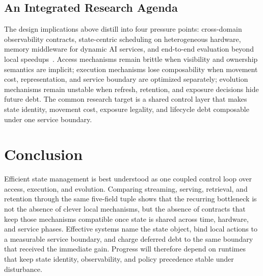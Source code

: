 ﻿\documentclass[manuscript]{acmart}
\begin{document}
\subsection{An Integrated Research Agenda}

The design implications above distill into four pressure points: cross-domain observability contracts, state-centric scheduling on heterogeneous hardware, memory middleware for dynamic AI services, and end-to-end evaluation beyond local speedups~\cite{zhang2019briskstream,zhang2020finestream,kwon2023pagedattention,sheng2023flexgen,cong2026mico,zhang2026neuromem,liu2026sage}. Access mechanisms remain brittle when visibility and ownership semantics are implicit; execution mechanisms lose composability when movement cost, representation, and service boundary are optimized separately; evolution mechanisms remain unstable when refresh, retention, and exposure decisions hide future debt. The common research target is a shared control layer that makes state identity, movement cost, exposure legality, and lifecycle debt composable under one service boundary.

\section{Conclusion}
\label{sec:conclusion}

Efficient state management is best understood as one coupled control loop over access, execution, and evolution. Comparing streaming, serving, retrieval, and retention through the same five-field tuple shows that the recurring bottleneck is not the absence of clever local mechanisms, but the absence of contracts that keep those mechanisms compatible once state is shared across time, hardware, and service phases. Effective systems name the state object, bind local actions to a measurable service boundary, and charge deferred debt to the same boundary that received the immediate gain. Progress will therefore depend on runtimes that keep state identity, observability, and policy precedence stable under disturbance.

\clearpage



\end{document}
